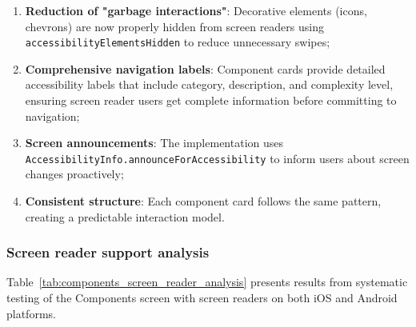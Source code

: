 \begin{enumerate}
    \item \textbf{Reduction of "garbage interactions"}: Decorative elements (icons, chevrons) are now properly hidden from screen readers using \\ \texttt{accessibilityElementsHidden} to reduce unnecessary swipes;
    
    \item \textbf{Comprehensive navigation labels}: Component cards provide detailed accessibility labels that include category, description, and complexity level, ensuring screen reader users get complete information before committing to navigation;
    
    \item \textbf{Screen announcements}: The implementation uses \\ \texttt{AccessibilityInfo.announceForAccessibility} to inform users about screen changes proactively;
    
    \item \textbf{Consistent structure}: Each component card follows the same pattern, creating a predictable interaction model.
\end{enumerate}

\subsubsection{Screen reader support analysis}

Table~\ref{tab:components_screen_reader_analysis} presents results from systematic testing of the Components screen with screen readers on both iOS and Android platforms.

